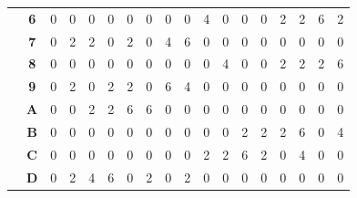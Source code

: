 \documentclass[fleqn]{article}
\begin{document}
\begin{table}[H]
\begin{tabular}{c|c|c|c|c|c|c|c|c|c|c|c|c|c|c|c|c|c|}
\multicolumn{1}{|c|}{}                                      & \textbf{6} & 0          & 0          & 0          & 0          & 0          & 0          & 0          & 0          & 4          & 0          & 0          & 0          & 2          & 2          & 6          & 2          \\ \cline{2-18} 
\multicolumn{1}{|c|}{}                                      & \textbf{7} & 0          & 2          & 2          & 0          & 2          & 0          & 4          & 6          & 0          & 0          & 0          & 0          & 0          & 0          & 0          & 0          \\ \cline{2-18} 
\multicolumn{1}{|c|}{}                                      & \textbf{8} & 0          & 0          & 0          & 0          & 0          & 0          & 0          & 0          & 0          & 4          & 0          & 0          & 2          & 2          & 2          & 6          \\ \cline{2-18} 
\multicolumn{1}{|c|}{}                                      & \textbf{9} & 0          & 2          & 0          & 2          & 2          & 0          & 6          & 4          & 0          & 0          & 0          & 0          & 0          & 0          & 0          & 0          \\ \cline{2-18} 
\multicolumn{1}{|c|}{}                                      & \textbf{A} & 0          & 0          & 2          & 2          & 6          & 6          & 0          & 0          & 0          & 0          & 0          & 0          & 0          & 0          & 0          & 0          \\ \cline{2-18} 
\multicolumn{1}{|c|}{}                                      & \textbf{B} & 0          & 0          & 0          & 0          & 0          & 0          & 0          & 0          & 0          & 0          & 2          & 2          & 2          & 6          & 0          & 4          \\ \cline{2-18} 
\multicolumn{1}{|c|}{}                                      & \textbf{C} & 0          & 0          & 0          & 0          & 0          & 0          & 0          & 0          & 2          & 2          & 6          & 2          & 0          & 4          & 0          & 0          \\ \cline{2-18} 
\multicolumn{1}{|c|}{}                                      & \textbf{D} & 0          & 2          & 4          & 6          & 0          & 2          & 0          & 2          & 0          & 0          & 0          & 0          & 0          & 0          & 0          & 0          \\ \cline{2-18} 

\end{tabular}
\end{table}
\end{document}
